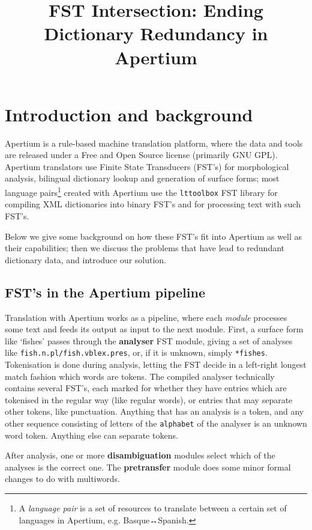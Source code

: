 \documentclass[10pt, a4paper]{article}
\title{FST Intersection: Ending Dictionary Redundancy in Apertium} %
\newcommand{\ana}[1]{\texttt{#1}}
\newcommand{\f}[1]{`#1'}
\newcommand{\tool}[1]{\texttt{#1}}
\begin{document}
\maketitleabstract

\section{Introduction and background}

Apertium \cite{forcada2011afp} is a rule-based machine translation
platform, where the data and tools are released under a Free and Open
Source license (primarily GNU GPL). Apertium translators use Finite
State Transducers (FST's) for morphological analysis, bilingual
dictionary lookup and generation of surface forms; most language
pairs\footnote{A \emph{language pair} is a set of resources to
  translate between a certain set of languages in Apertium, e.g.
  Basque↔Spanish.} created with Apertium use the \tool{lttoolbox}
FST library for compiling XML dictionaries into binary FST's and for
processing text with such FST's.

Below we give some background on how these FST's fit into Apertium as
well as their capabilities; then we discuss the problems that have
lead to redundant dictionary data, and introduce our solution.

\subsection{FST's in the Apertium pipeline}
\label{sec:pipeline}

Translation with Apertium works as a pipeline, where each
\emph{module} processes some text and feeds its output as input to the
next module. First, a surface form like \f{fishes} passes through the
\textbf{analyser} FST module, giving a set of analyses like
\ana{fish.n.pl/fish.vblex.pres}, or, if it is unknown, simply
\ana{*fishes}. Tokenisation is done during analysis, letting the FST
decide in a left-right longest match fashion which words are tokens.
The compiled analyser technically contains several FST's, each marked
for whether they have entries which are tokenised in the regular
way (like regular words), or entries that may separate other tokens,
like punctuation. Anything that has an analysis is a token, and any
other sequence consisting of letters of the \texttt{alphabet} of the
analyser is an unknown word token. Anything else can separate tokens.

After analysis, one or more \textbf{disambiguation} modules select
which of the analyses is the correct one. The \textbf{pretransfer}
module does some minor formal changes to do with multiwords.
\end{document}
